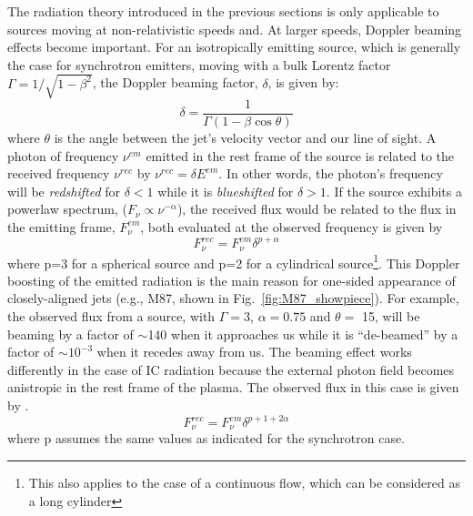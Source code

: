 The radiation theory introduced in the previous sections is only applicable to sources moving at non-relativistic speeds and. At larger speeds, Doppler beaming effects become important. For an isotropically emitting source, which is generally the case for synchrotron emitters, moving with a bulk Lorentz factor $\Gamma=1/\sqrt{1-\beta^2}$, the Doppler beaming factor, $\delta$, is given by:
\begin{equation}
    \delta = \frac{1}{\Gamma(1-\beta\cos{\theta})}
\end{equation}
where $\theta$ is the angle between the jet's velocity vector and our line of sight. A photon of frequency $\nu^{em}$ emitted in the rest frame of the source is related to the received frequency $\nu^{rec}$ by $\nu^{rec}= \delta E^{em}$. 
In other words, the photon's frequency will be \textit{redshifted} for $\delta<1$ while it is \textit{blueshifted} for $\delta>1$. If the source exhibits a powerlaw spectrum, ($F_\nu\propto\nu^{-\alpha}$), the received flux would be related to the flux in the emitting frame, $F^{em}_{{\nu}}$, both evaluated at the observed frequency is given by \citep[e.g.,][]{dermer1995beaming}
\begin{equation}\label{eq:flux}
    F^{rec}_{\nu}=F^{em}_{{\nu}}\delta^{p+\alpha}
\end{equation}
where p=3 for a spherical source and p=2 for a cylindrical source\footnote{This also applies to the case of a continuous flow, which can be considered as a long cylinder}.
This Doppler boosting of the emitted radiation is the main reason for one-sided appearance of closely-aligned jets (e.g., M87, shown in Fig.~\ref{fig:M87_showpiece}). For example, the observed flux from a source, with $\Gamma=3$, $\alpha=0.75$ and $\theta=$ 15\textdegree, will be beaming by a factor of $\sim$140 when it approaches us while it is ``de-beamed'' by a factor of $\sim$$10^{-3}$ when it recedes away from us. The beaming effect works differently in the case of IC radiation  because the external photon field becomes anistropic in the rest frame of the plasma. The observed flux in this case is given by \citep[e.g.,][]{dermer1995beaming,georganopoulos2001beaming}.
\begin{equation}\label{eq:ic_beaming}
    F^{rec}_{\nu}=F^{em}_{{\nu}}\delta^{p+1+2\alpha}
\end{equation}
where p assumes the same values as indicated for the synchrotron case. 


